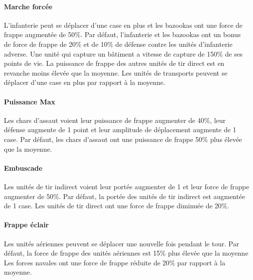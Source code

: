 \documentclass[12pt]{report}
\begin{document}
        \paragraph{Marche forcée}L'infanterie peut se déplacer d'une case en plus et les bazookas ont une force de frappe augmentée de 50\%.
        Par défaut, l'infanterie et les bazookas ont un bonus de force de frappe de 20\% et de 10\% de défense contre les unités d'infanterie adverse. Une unité qui capture un bâtiment a vitesse de capture de 150\% de ses points de vie.
        La puissance de frappe des autres unités de tir direct est en revanche moins élevée que la moyenne. Les unités de transports peuvent se déplacer d'une case en plus par rapport à la moyenne.
        
        \paragraph{Puissance Max}Les chars d'assaut voient leur puissance de frappe augmenter de 40\%, leur défense augmente de 1 point et leur amplitude de déplacement augmente de 1 case.
        Par défaut, les chars d'assaut ont une puissance de frappe 50\% plus élevée que la moyenne.
        
        \paragraph{Embuscade}Les unités de tir indirect voient leur portée augmenter de 1 et leur force de frappe augmenter de 50\%.
        Par défaut, la portée des unités de tir indirect est augmentée de 1 case. Les unités de tir direct ont une force de frappe diminuée de 20\%.
        
        \paragraph{Frappe éclair}Les unités aériennes peuvent se déplacer une nouvelle fois pendant le tour.
        Par défaut, la force de frappe des unités aériennes est 15\% plus élevée que la moyenne Les forces navales ont une force de frappe réduite de 20\% par rapport à la moyenne.
        
\end{document}
